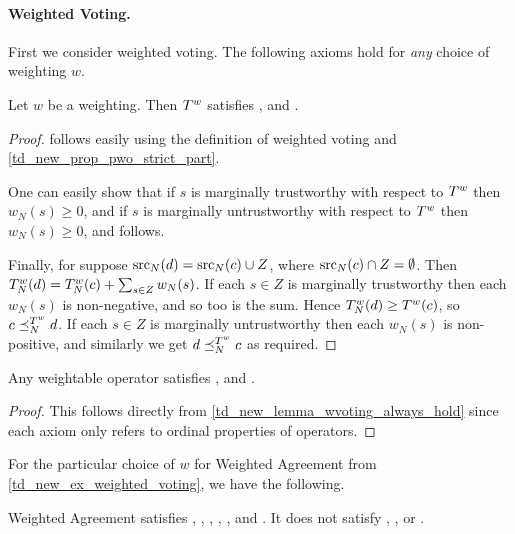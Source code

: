 \paragraph{Weighted Voting.}

First we consider weighted voting. The following axioms hold for \emph{any}
choice of weighting $w$.

\begin{lemma}
    \label{td_new_lemma_wvoting_always_hold}
    Let $w$ be a weighting. Then $T^{w}$ satisfies \claimcoherence{},
    \marginaltrustworthiness{} and \trustbasedmon{}.
\end{lemma}

\begin{proof}
    \claimcoherence{} follows easily using the definition of weighted
    voting and \cref{td_new_prop_pwo_strict_part}.

    One can easily show that if $s$ is marginally trustworthy with respect to
    $T^{w}$ then $w_N(s) \ge 0$, and if $s$ is marginally untrustworthy
    with respect to $T^{w}$ then $w_N(s) \ge 0$, and
    \marginaltrustworthiness{} follows.

    Finally, for \trustbasedmon{} suppose $\operatorname{src}_N(d) = \operatorname{src}_N(c) \cup Z$, where
    $\operatorname{src}_N(c) \cap Z = \emptyset$. Then $T^{w}_N(d) = T^{w}_N(c) +
    \sum_{s \in Z}{w_N(s)}$. If each $s \in Z$ is marginally trustworthy then
    each $w_N(s)$ is non-negative, and so too is the sum. Hence
    $T^{w}_N(d) \ge T^{w}(c)$, so $c \preceq_N^{T^{w}} d$. If
    each $s \in Z$ is marginally untrustworthy then each $w_N(s)$ is
    non-positive, and similarly we get $d \preceq_N^{T^{w}} c$ as required.
\end{proof}

\begin{corollary}
    \label{td_new_cor_weightable_axioms}
    Any weightable operator satisfies \claimcoherence{},
    \marginaltrustworthiness{} and \trustbasedmon{}.
\end{corollary}

\begin{proof}
    This follows directly from \cref{td_new_lemma_wvoting_always_hold} since
    each axiom only refers to ordinal properties of operators.
\end{proof}

For the particular choice of $w$ for Weighted Agreement from
\cref{td_new_ex_weighted_voting}, we have the following.

\begin{theorem}
    Weighted Agreement satisfies \claimcoherence{}, \symmetry{},
    \freshposresp{}, \sourceposresp{}, \marginaltrustworthiness{},
    \trustbasedmon{} and \disjointindependence{}. It does not satisfy
    \sourcecoherence{}, \classicalindependence{}, \conflictcoherence{} or
    \anticoherence{}.
\end{theorem}

